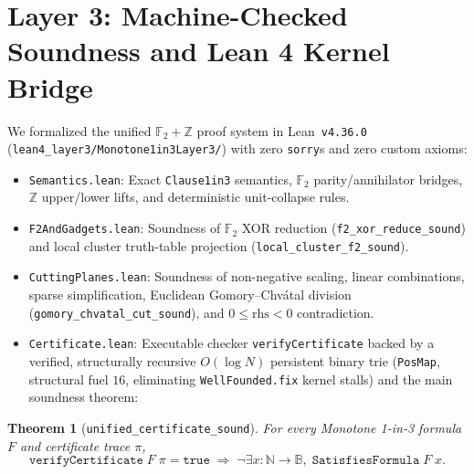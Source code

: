 \documentclass[11pt]{article}
\newtheorem{theorem}{Theorem}
\begin{document}
\section{Layer 3: Machine-Checked Soundness and Lean 4 Kernel Bridge}

We formalized the unified $\mathbb{F}_2 + \mathbb{Z}$ proof system in Lean~\texttt{v4.36.0} (\texttt{lean4\_layer3/\allowbreak Monotone1in3Layer3/}) with zero \texttt{sorry}s and zero custom axioms:
\begin{itemize}
  \item \texttt{Semantics.lean}: Exact \texttt{Clause1in3} semantics, $\mathbb{F}_2$ parity/annihilator bridges, $\mathbb{Z}$ upper/lower lifts, and deterministic unit-collapse rules.
  \item \texttt{F2AndGadgets.lean}: Soundness of $\mathbb{F}_2$ XOR reduction (\texttt{f2\_xor\_reduce\_sound}) and local cluster truth-table projection (\texttt{local\_cluster\_f2\_sound}).
  \item \texttt{CuttingPlanes.lean}: Soundness of non-negative scaling, linear combinations, sparse simplification, Euclidean Gomory--Chv\'atal division (\texttt{gomory\_chvatal\_cut\_sound}), and $0 \le \text{rhs} < 0$ contradiction.
  \item \texttt{Certificate.lean}: Executable checker \texttt{verifyCertificate} backed by a verified, structurally recursive $O(\log N)$ persistent binary trie (\texttt{PosMap}, structural fuel $16$, eliminating \texttt{WellFounded.fix} kernel stalls) and the main soundness theorem:
\end{itemize}

\begin{theorem}[\texttt{unified\_certificate\_sound}]
For every Monotone 1-in-3 formula $F$ and certificate trace $\pi$,
\[
\texttt{verifyCertificate}\; F\; \pi = \texttt{true} \;\Longrightarrow\; \neg \exists x : \mathbb{N} \to \mathbb{B},\; \texttt{SatisfiesFormula}\; F\; x.
\]
\end{theorem}
\end{document}
